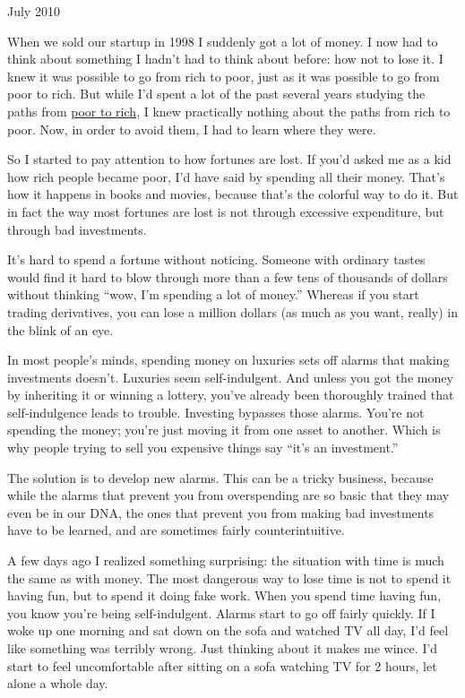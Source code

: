 July 2010

When we sold our startup in 1998 I suddenly got a lot of money. I now
had to think about something I hadn't had to think about before: how not
to lose it. I knew it was possible to go from rich to poor, just as it
was possible to go from poor to rich. But while I'd spent a lot of the
past several years studying the paths from \href{wealth.html}{poor to
rich}, I knew practically nothing about the paths from rich to poor.
Now, in order to avoid them, I had to learn where they were.

So I started to pay attention to how fortunes are lost. If you'd asked
me as a kid how rich people became poor, I'd have said by spending all
their money. That's how it happens in books and movies, because that's
the colorful way to do it. But in fact the way most fortunes are lost is
not through excessive expenditure, but through bad investments.

It's hard to spend a fortune without noticing. Someone with ordinary
tastes would find it hard to blow through more than a few tens of
thousands of dollars without thinking ``wow, I'm spending a lot of
money.'' Whereas if you start trading derivatives, you can lose a
million dollars (as much as you want, really) in the blink of an eye.

In most people's minds, spending money on luxuries sets off alarms that
making investments doesn't. Luxuries seem self-indulgent. And unless you
got the money by inheriting it or winning a lottery, you've already been
thoroughly trained that self-indulgence leads to trouble. Investing
bypasses those alarms. You're not spending the money; you're just moving
it from one asset to another. Which is why people trying to sell you
expensive things say ``it's an investment.''

The solution is to develop new alarms. This can be a tricky business,
because while the alarms that prevent you from overspending are so basic
that they may even be in our DNA, the ones that prevent you from making
bad investments have to be learned, and are sometimes fairly
counterintuitive.

A few days ago I realized something surprising: the situation with time
is much the same as with money. The most dangerous way to lose time is
not to spend it having fun, but to spend it doing fake work. When you
spend time having fun, you know you're being self-indulgent. Alarms
start to go off fairly quickly. If I woke up one morning and sat down on
the sofa and watched TV all day, I'd feel like something was terribly
wrong. Just thinking about it makes me wince. I'd start to feel
uncomfortable after sitting on a sofa watching TV for 2 hours, let alone
a whole day.

